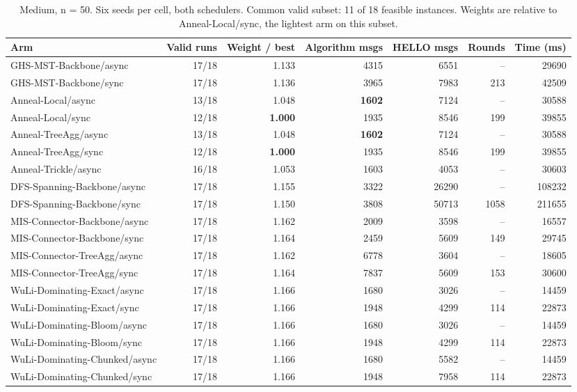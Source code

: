 \begin{table}[tb]
\centering
\caption{Medium, n = 50. Six seeds per cell, both schedulers. Common valid subset: 11 of 18 feasible instances. Weights are relative to Anneal-Local/sync, the lightest arm on this subset.}
\label{tab:cmp-sweep_medium_n50_k6_join}
\begin{tabular}{lrrrrrr}
\toprule
Arm & Valid runs & Weight / best & Algorithm msgs & HELLO msgs & Rounds & Time (ms) \\
\midrule
GHS-MST-Backbone/async & 17/18 & 1.133 & 4315 & 6551 & -- & 29690 \\
GHS-MST-Backbone/sync & 17/18 & 1.136 & 3965 & 7983 & 213 & 42509 \\
Anneal-Local/async & 13/18 & 1.048 & \textbf{1602} & 7124 & -- & 30588 \\
Anneal-Local/sync & 12/18 & \textbf{1.000} & 1935 & 8546 & 199 & 39855 \\
Anneal-TreeAgg/async & 13/18 & 1.048 & \textbf{1602} & 7124 & -- & 30588 \\
Anneal-TreeAgg/sync & 12/18 & \textbf{1.000} & 1935 & 8546 & 199 & 39855 \\
Anneal-Trickle/async & 16/18 & 1.053 & 1603 & 4053 & -- & 30603 \\
DFS-Spanning-Backbone/async & 17/18 & 1.155 & 3322 & 26290 & -- & 108232 \\
DFS-Spanning-Backbone/sync & 17/18 & 1.150 & 3808 & 50713 & 1058 & 211655 \\
MIS-Connector-Backbone/async & 17/18 & 1.162 & 2009 & 3598 & -- & 16557 \\
MIS-Connector-Backbone/sync & 17/18 & 1.164 & 2459 & 5609 & 149 & 29745 \\
MIS-Connector-TreeAgg/async & 17/18 & 1.162 & 6778 & 3604 & -- & 18605 \\
MIS-Connector-TreeAgg/sync & 17/18 & 1.164 & 7837 & 5609 & 153 & 30600 \\
WuLi-Dominating-Exact/async & 17/18 & 1.166 & 1680 & 3026 & -- & 14459 \\
WuLi-Dominating-Exact/sync & 17/18 & 1.166 & 1948 & 4299 & 114 & 22873 \\
WuLi-Dominating-Bloom/async & 17/18 & 1.166 & 1680 & 3026 & -- & 14459 \\
WuLi-Dominating-Bloom/sync & 17/18 & 1.166 & 1948 & 4299 & 114 & 22873 \\
WuLi-Dominating-Chunked/async & 17/18 & 1.166 & 1680 & 5582 & -- & 14459 \\
WuLi-Dominating-Chunked/sync & 17/18 & 1.166 & 1948 & 7958 & 114 & 22873 \\

\end{tabular}
\end{table}
